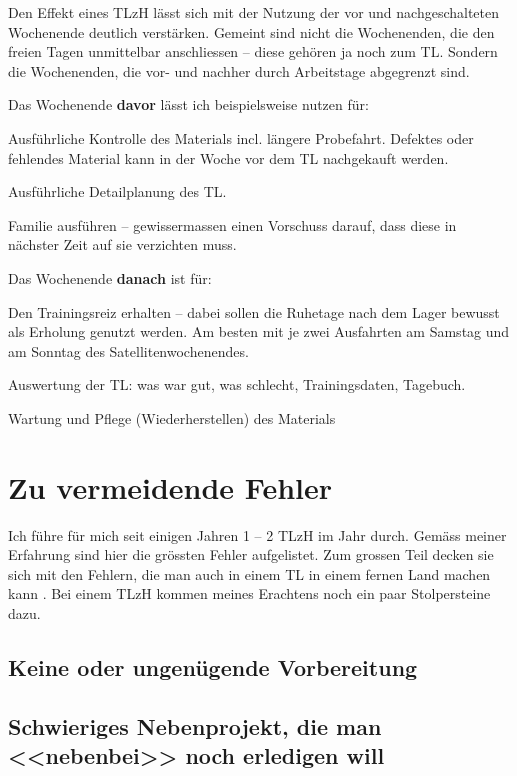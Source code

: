 \documentclass[a4paper,DIV13,BCOR0cm]{scrartcl}
\newcommand{\tlzh}{TLzH}
\begin{document}
Den Effekt eines \tlzh{} lässt sich mit der Nutzung der vor und nachgeschalteten Wochenende deutlich verstärken.
Gemeint sind nicht die Wochenenden, die den freien Tagen unmittelbar anschliessen -- diese gehören ja noch zum TL.
Sondern die Wochenenden, die vor- und nachher durch Arbeitstage abgegrenzt sind.

Das Wochenende \textbf{davor} lässt ich beispielsweise nutzen für:
\begin{itemize*}
  \item Ausführliche Kontrolle des Materials incl. längere Probefahrt.
    Defektes oder fehlendes Material kann in der Woche vor dem TL nachgekauft werden.
  \item Ausführliche Detailplanung des TL.
  \item Familie ausführen -- gewissermassen einen Vorschuss darauf, dass diese in nächster Zeit auf sie verzichten muss.
\end{itemize*}

Das Wochenende \textbf{danach} ist für:

\begin{itemize*}
  \item Den Trainingsreiz erhalten -- dabei sollen die Ruhetage nach dem Lager bewusst als Erholung genutzt werden.
    Am besten mit je zwei Ausfahrten am Samstag und am Sonntag des Satellitenwochenendes.
  \item Auswertung der TL: was war gut, was schlecht, Trainingsdaten, Tagebuch.
  \item Wartung und Pflege (Wiederherstellen) des Materials
\end{itemize*}


\section{Zu vermeidende Fehler}

Ich führe für mich seit einigen Jahren 1 -- 2 \tlzh{} im Jahr durch.
Gemäss meiner Erfahrung sind hier die grössten Fehler aufgelistet.
Zum grossen Teil decken sie sich mit den Fehlern, die man auch in einem TL in einem fernen Land machen kann \cite{Beck2016trainingslagersuenden}.
Bei einem \tlzh{} kommen meines Erachtens noch ein paar Stolpersteine dazu.

\subsection{Keine oder ungenügende Vorbereitung}


\subsection{Schwieriges Nebenprojekt, die man <<nebenbei>> noch erledigen will}
\end{document}
